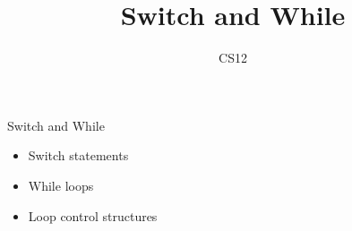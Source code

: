\documentclass{beamer}
\title{Switch and While}
\author{CS12}
\date{}
\begin{document}
\begin{frame}
    \titlepage
\end{frame}

\begin{frame}{Switch and While}
    \begin{itemize}
        \item Switch statements
        \item While loops
        \item Loop control structures
    \end{itemize}
\end{frame}
\end{document}
